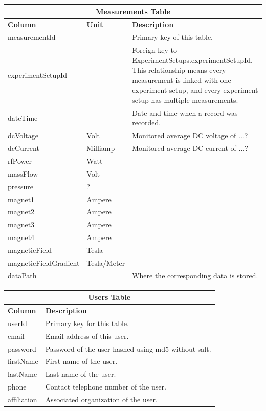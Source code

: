 \begin{table}[h!]
\centering
\begin{tabular}{l l p{8cm}}
\multicolumn{3}{c}{\bf Measurements Table} \\ \hline
{\bf Column} & {\bf Unit} & {\bf Description}\\ \hline
measurementId & & Primary key of this table.\\ \hline
experimentSetupId & & Foreign key to ExperimentSetups.experimentSetupId. This relationship means every measurement is linked with one experiment setup, and every experiment setup has multiple measurements.\\ \hline
dateTime & & Date and time when a record was recorded.\\ \hline
dcVoltage & Volt & Monitored average DC voltage of ...?\\ \hline
dcCurrent & Milliamp & Monitored average DC current of ...?\\ \hline
rfPower & Watt & \\ \hline
massFlow & Volt & \\ \hline
pressure & ? & \\ \hline
magnet1 & Ampere & \\ \hline
magnet2 & Ampere & \\ \hline
magnet3 & Ampere & \\ \hline
magnet4 & Ampere & \\ \hline
magneticField & Tesla & \\ \hline
magneticFieldGradient & Tesla/Meter & \\ \hline
dataPath & & Where the corresponding data is stored.\\ \hline
\end{tabular}
\end{table}

\begin{table}[h!]
\centering
\begin{tabular}{l p{12cm}}
\multicolumn{2}{c}{\bf Users Table} \\ \hline
{\bf Column} & {\bf Description}\\ \hline
userId & Primary key for this table.\\ \hline
email & Email address of this user.\\ \hline
password & Password of the user hashed using md5 without salt.\\ \hline
firstName & First name of the user.\\ \hline
lastName & Last name of the user.\\ \hline
phone & Contact telephone number of the user.\\ \hline
affiliation & Associated organization of the user.\\ \hline
\end{tabular}
\end{table}

